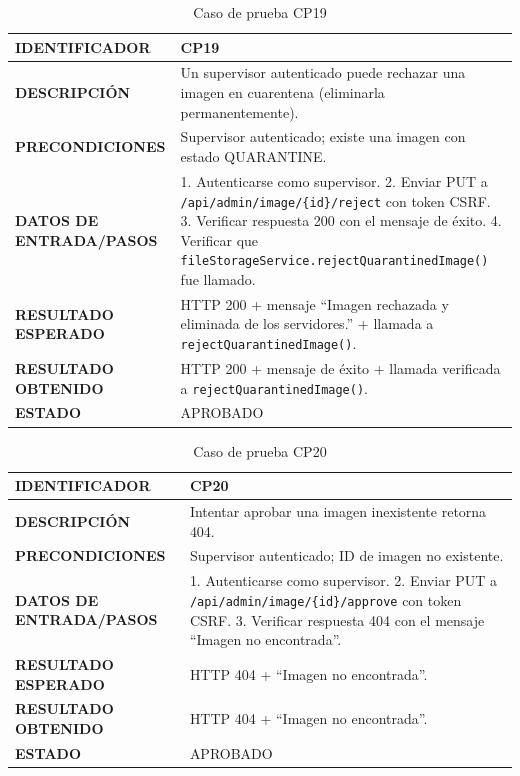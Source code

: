 \begin{table}[H]
\centering
\caption{Caso de prueba CP19}
\begin{tabular}{|p{3.5cm}|p{10.3cm}|}
\hline
\textbf{IDENTIFICADOR} & CP19 \\
\hline
\textbf{DESCRIPCIÓN} & Un supervisor autenticado puede rechazar una imagen en cuarentena (eliminarla permanentemente). \\
\hline
\textbf{PRECONDICIONES} & Supervisor autenticado; existe una imagen con estado QUARANTINE. \\
\hline
\textbf{DATOS DE ENTRADA/PASOS} & 1. Autenticarse como supervisor. 2. Enviar PUT a \texttt{/api/admin/image/\{id\}/reject} con token CSRF. 3. Verificar respuesta 200 con el mensaje de éxito. 4. Verificar que \texttt{fileStorageService.rejectQuarantinedImage()} fue llamado. \\
\hline
\textbf{RESULTADO ESPERADO} & HTTP 200 + mensaje ``Imagen rechazada y eliminada de los servidores.'' + llamada a \texttt{rejectQuarantinedImage()}. \\
\hline
\textbf{RESULTADO OBTENIDO} & HTTP 200 + mensaje de éxito + llamada verificada a \texttt{rejectQuarantinedImage()}. \\
\hline
\textbf{ESTADO} & APROBADO \\
\hline
\end{tabular}
\end{table}

\begin{table}[H]
\centering
\caption{Caso de prueba CP20}
\begin{tabular}{|p{3.5cm}|p{10.3cm}|}
\hline
\textbf{IDENTIFICADOR} & CP20 \\
\hline
\textbf{DESCRIPCIÓN} & Intentar aprobar una imagen inexistente retorna 404. \\
\hline
\textbf{PRECONDICIONES} & Supervisor autenticado; ID de imagen no existente. \\
\hline
\textbf{DATOS DE ENTRADA/PASOS} & 1. Autenticarse como supervisor. 2. Enviar PUT a \texttt{/api/admin/image/\{id\}/approve} con token CSRF. 3. Verificar respuesta 404 con el mensaje ``Imagen no encontrada''. \\
\hline
\textbf{RESULTADO ESPERADO} & HTTP 404 + ``Imagen no encontrada''. \\
\hline
\textbf{RESULTADO OBTENIDO} & HTTP 404 + ``Imagen no encontrada''. \\
\hline
\textbf{ESTADO} & APROBADO \\
\hline
\end{tabular}
\end{table}

